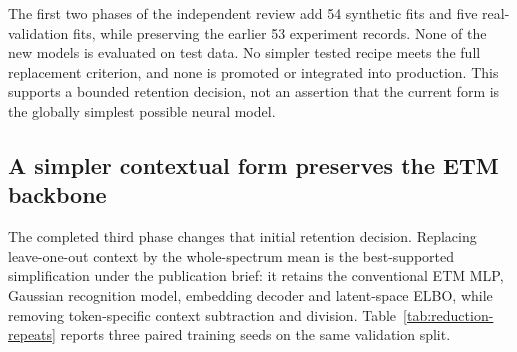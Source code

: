 \documentclass[10pt,a4paper]{article}
\begin{document}
The first two phases of the independent review add 54 synthetic fits and five real-validation
fits, while preserving the earlier 53 experiment records. None of the new
models is evaluated on test data. No simpler tested recipe meets the full
replacement criterion, and none is promoted or integrated into production.
This supports a bounded retention decision, not an assertion that the current
form is the globally simplest possible neural model.

\subsection{A simpler contextual form preserves the ETM backbone}
\label{sec:reduction-results}

The completed third phase changes that initial retention decision. Replacing
leave-one-out context by the whole-spectrum mean is the best-supported
simplification under the publication brief: it retains the conventional ETM
MLP, Gaussian recognition model, embedding decoder and latent-space ELBO,
while removing token-specific context subtraction and division. Table~\ref{tab:reduction-repeats}
reports three paired training seeds on the same validation split.

\begin{table}[htbp]
\centering
\small
\setlength{\tabcolsep}{4pt}
\caption{Within-model validation repeats at $K=1000$: means $\pm$ sample
standard deviations over seeds 11, 23 and 42 (training seeds offset by 7001).
Current means the original two-layer, width-800 MLP with leave-one-out context;
one hidden layer has width 800. Parameters count trainable coordinates, not
fixed SGNS embeddings. Useful means SOS at least 0.6, conditional mean SOS
describes evaluable motifs, NLL is completion loss in nats per token, and
effective topics are the median exponentiated mixture entropy per run.
The seed-42 current run is reused from phase 1, not retrained or counted twice.
Three initializations describe same-split variability, not external confidence bounds.}
\label{tab:reduction-repeats}
\end{table}
\end{document}
